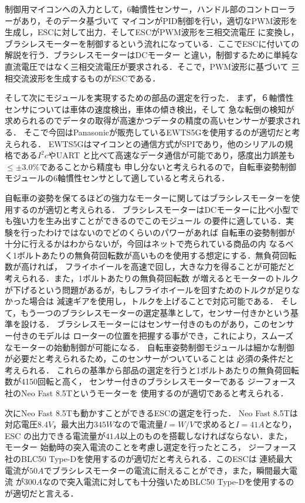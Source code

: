\documentclass[uplatex,dvipdfmx]{jsarticle}
\begin{document}
制御用マイコンへの入力として，6軸慣性センサー，ハンドル部のコントローラーがあり，そのデータ基づいて
マイコンがPID制御を行い，適切なPWM波形を生成し，ESCに対して出力．そしてESCがPWM波形を三相交流電圧
に変換し，ブラシレスモーターを制御するという流れになっている．ここでESCに付いての解説を行う．ブラシレスモーターはDCモーター
と違い，制御するために単純な直流電圧ではなく三相交流電圧が要求される．そこで，PWM波形に基づいて
三相交流波形を生成するものがESCである．

そして次にモジュールを実現するための部品の選定を行った．
まず，６軸慣性センサについては車体の速度検出，車体の傾き検出，そして
急な転倒の検知が求められるのでデータの取得が高速かつデータの精度の高いセンサーが要求される．
そこで今回はPanasonicが販売しているEWTS5Gを使用するのが適切だと考えられる\cite{rokujiku}．
EWTS5Gはマイコンとの通信方式がSPIであり，他のシリアルの規格である$I^2c$やUART
と比べて高速なデータ通信が可能であり，感度出力誤差も$\leq \pm 3.0\%$であることから精度も
申し分ないと考えられるので，自転車姿勢制御モジュールの6軸慣性センサとして適していると考えられる．

自転車の姿勢を保てるほどの強力なモーターに関してはブラシレスモーターを使用するのが適切と考えられる．
ブラシレスモーターはDCモーターに比べ小型でも強い力を生み出すことができるのでこのモジュール
の要件に適している．実験を行ったわけではないのでどのくらいのパワーがあれば
自転車の姿勢制御が十分に行えるかはわからないが，今回はネットで売られている商品の内
なるべく1ボルトあたりの無負荷回転数が高いものを使用する想定にする．無負荷回転数が高ければ，
フライホイールを高速で回し，大きな力を得ることが可能だと考えられる．また，1ボルトあたりの無負荷回転数
が増えるとモーターのトルクが下げるという問題があるが，もしフライホイールを回すためのトルクが足りなかった場合は
減速ギアを使用し，トルクを上げることで対応可能である．
そして，もう一つのブラシレスモーターの選定基準として，センサー付きかという基準を設ける．
ブラシレスモーターにはセンサー付きのものがあり，このセンサー付きのモデルは
ローターの位置を把握する事ができ，これにより，スムーズなモーターの始動制御が可能になる．
自転車姿勢制御モジュールは細かな制御が必要だと考えられるため，このセンサーがついていることは
必須の条件だと考えられる．
これらの基準から部品の選定を行うと1ボルトあたりの無負荷回転数が4150回転と高く，
センサー付きのブラシレスモーターである
ジーフォース社のNeo Fast 8.5Tというモーターを
使用するのが適切であると考えられる\cite{burasiresu}．

次にNeo Fast 8.5Tも動かすことができるESCの選定を行った．
Neo Fast 8.5Tは
対応電圧$8.4V$，最大出力$345W$なので電流量$I=W/V$で求めると$I=41A$となり，ESC
の出力できる電流量が$41A$以上のものを搭載しなければならない．また，モーター
始動時の突入電流のことを考慮し選定を行ったところ，
ジーフォース社のBLC50 Type-Dを使用するのが適切だと考えられる．このESCは
連続最大電流が$50A$でブラシレスモーターの電流に耐えることができ，また，瞬間最大電流
が$300A$なので突入電流に対しても十分強いためBLC50 Type-Dを使用するのが適切だと言える\cite{esc}．
\end{document}
